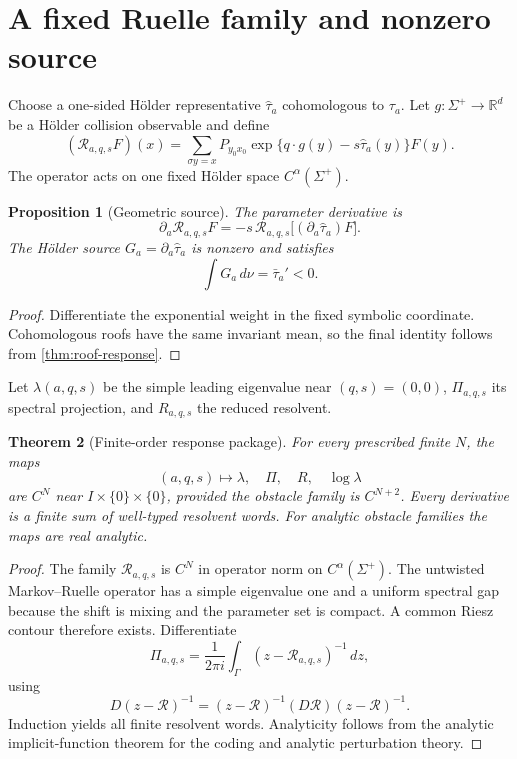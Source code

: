 \documentclass[11pt,reqno]{amsart}
\newtheorem{theorem}{Theorem}[section]
\newtheorem{proposition}[theorem]{Proposition}
\theoremstyle{definition}
\theoremstyle{remark}
\newcommand{\R}{\mathbb R}
\begin{document}
\section{A fixed Ruelle family and nonzero source}\label{sec:ruelle}

Choose a one-sided Hölder representative $\widehat\tau_a$ cohomologous to
$\tau_a$.  Let $g:\Sigma^+\to\R^d$ be a Hölder collision observable and define
\[
 (\mathcal R_{a,q,s}F)(x)
 =
 \sum_{\sigma y=x}
 P_{y_0x_0}
 \exp\{q\cdot g(y)-s\widehat\tau_a(y)\}F(y).
\]
The operator acts on one fixed Hölder space $C^\alpha(\Sigma^+)$.

\begin{proposition}[Geometric source]\label{prop:source}
The parameter derivative is
\[
 \partial_a\mathcal R_{a,q,s}F
 =
 -s\,\mathcal R_{a,q,s}
 \bigl[(\partial_a\widehat\tau_a)F\bigr].
\]
The Hölder source $G_a=\partial_a\widehat\tau_a$ is nonzero and satisfies
\[
 \int G_a\,d\nu=\bar\tau_a'<0.
\]
\end{proposition}

\begin{proof}
Differentiate the exponential weight in the fixed symbolic coordinate.
Cohomologous roofs have the same invariant mean, so the final identity follows
from \cref{thm:roof-response}.
\end{proof}

Let $\lambda(a,q,s)$ be the simple leading eigenvalue near $(q,s)=(0,0)$,
$\Pi_{a,q,s}$ its spectral projection, and $R_{a,q,s}$ the reduced resolvent.

\begin{theorem}[Finite-order response package]\label{thm:response-package}
For every prescribed finite $N$, the maps
\[
 (a,q,s)\longmapsto
 \lambda,\quad \Pi,\quad R,\quad \log\lambda
\]
are $C^N$ near $I\times\{0\}\times\{0\}$, provided the obstacle family is
$C^{N+2}$.  Every derivative is a finite sum of well-typed resolvent words.
For analytic obstacle families the maps are real analytic.
\end{theorem}

\begin{proof}
The family $\mathcal R_{a,q,s}$ is $C^N$ in operator norm on
$C^\alpha(\Sigma^+)$.  The untwisted Markov--Ruelle operator has a simple
eigenvalue one and a uniform spectral gap because the shift is mixing and the
parameter set is compact.  A common Riesz contour therefore exists.
Differentiate
\[
 \Pi_{a,q,s}
 =\frac1{2\pi i}\int_\Gamma
 (z-\mathcal R_{a,q,s})^{-1}\,dz,
\]
using
\[
 D(z-\mathcal R)^{-1}
 =(z-\mathcal R)^{-1}(D\mathcal R)(z-\mathcal R)^{-1}.
\]
Induction yields all finite resolvent words.  Analyticity follows from the
analytic implicit-function theorem for the coding and analytic perturbation
theory.
\end{proof}
\end{document}

